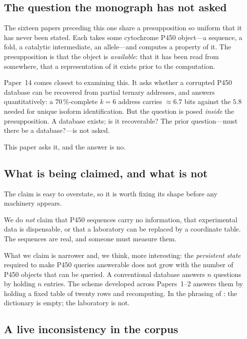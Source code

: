 \documentclass[11pt,twocolumn,a4paper]{article}
\theoremstyle{plain}
\theoremstyle{definition}
\theoremstyle{remark}
\begin{document}
\subsection{The question the monograph has not asked}

The sixteen papers preceding this one share a presupposition so uniform that
it has never been stated. Each takes some cytochrome P450 object---a
sequence, a fold, a catalytic intermediate, an allele---and computes a
property of it. The presupposition is that the object is \emph{available}:
that it has been read from somewhere, that a representation of it exists
prior to the computation.

Paper~14 comes closest to examining this. It asks whether a corrupted P450
database can be recovered from partial ternary addresses, and answers
quantitatively: a $70\,\%$-complete $k=6$ address carries ${\approx}6.7$
bits against the $5.8$ needed for unique isoform identification. But the
question is posed \emph{inside} the presupposition. A database exists; is it
recoverable? The prior question---must there be a database?---is not asked.

This paper asks it, and the answer is no.

\subsection{What is being claimed, and what is not}

The claim is easy to overstate, so it is worth fixing its shape before any
machinery appears.

We do \emph{not} claim that P450 sequences carry no information, that
experimental data is dispensable, or that a laboratory can be replaced by a
coordinate table. The sequences are real, and someone must measure them.

What we claim is narrower and, we think, more interesting: the
\emph{persistent state} required to make P450 queries answerable does not
grow with the number of P450 objects that can be queried. A conventional
database answers $n$ questions by holding $n$ entries. The scheme developed
across Papers~1--2 answers them by holding a fixed table of twenty rows and
recomputing. In the phrasing of \citet{sachikonye2025c}: the dictionary is
empty; the laboratory is not.

\subsection{A live inconsistency in the corpus}
\end{document}
